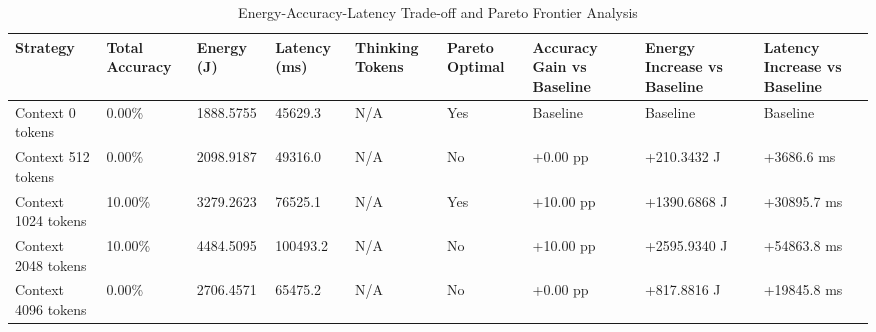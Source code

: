 \begin{table}
\caption{Energy-Accuracy-Latency Trade-off and Pareto Frontier Analysis}
\label{tab:tradeoff_comparison}
\begin{tabular}{lllllllll}
\toprule
Strategy & Total Accuracy & Energy (J) & Latency (ms) & Thinking Tokens & Pareto Optimal & Accuracy Gain vs Baseline & Energy Increase vs Baseline & Latency Increase vs Baseline \\
\midrule
Context 0 tokens & 0.00\% & 1888.5755 & 45629.3 & N/A & Yes & Baseline & Baseline & Baseline \\
Context 512 tokens & 0.00\% & 2098.9187 & 49316.0 & N/A & No & +0.00 pp & +210.3432 J & +3686.6 ms \\
Context 1024 tokens & 10.00\% & 3279.2623 & 76525.1 & N/A & Yes & +10.00 pp & +1390.6868 J & +30895.7 ms \\
Context 2048 tokens & 10.00\% & 4484.5095 & 100493.2 & N/A & No & +10.00 pp & +2595.9340 J & +54863.8 ms \\
Context 4096 tokens & 0.00\% & 2706.4571 & 65475.2 & N/A & No & +0.00 pp & +817.8816 J & +19845.8 ms \\
\bottomrule
\end{tabular}
\end{table}
